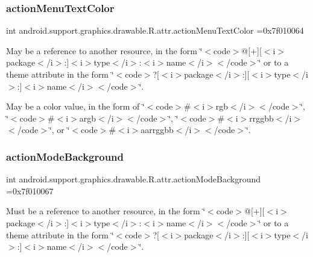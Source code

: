\subsubsection{\texorpdfstring{action\+Menu\+Text\+Color}{actionMenuTextColor}}
{\footnotesize\ttfamily int android.\+support.\+graphics.\+drawable.\+R.\+attr.\+action\+Menu\+Text\+Color =0x7f010064\hspace{0.3cm}{\ttfamily [static]}}

May be a reference to another resource, in the form \char`\"{}$<$code$>$@\mbox{[}+\mbox{]}\mbox{[}$<$i$>$package$<$/i$>$\+:\mbox{]}$<$i$>$type$<$/i$>$\+:$<$i$>$name$<$/i$>$$<$/code$>$\char`\"{} or to a theme attribute in the form \char`\"{}$<$code$>$?\mbox{[}$<$i$>$package$<$/i$>$\+:\mbox{]}\mbox{[}$<$i$>$type$<$/i$>$\+:\mbox{]}$<$i$>$name$<$/i$>$$<$/code$>$\char`\"{}. 

May be a color value, in the form of \char`\"{}$<$code$>$\#$<$i$>$rgb$<$/i$>$$<$/code$>$\char`\"{}, \char`\"{}$<$code$>$\#$<$i$>$argb$<$/i$>$$<$/code$>$\char`\"{}, \char`\"{}$<$code$>$\#$<$i$>$rrggbb$<$/i$>$$<$/code$>$\char`\"{}, or \char`\"{}$<$code$>$\#$<$i$>$aarrggbb$<$/i$>$$<$/code$>$\char`\"{}. \mbox{\label{classandroid_1_1support_1_1graphics_1_1drawable_1_1R_1_1attr_a41daf144407bb5aad9c15031a836bf73}} 
\subsubsection{\texorpdfstring{action\+Mode\+Background}{actionModeBackground}}
{\footnotesize\ttfamily int android.\+support.\+graphics.\+drawable.\+R.\+attr.\+action\+Mode\+Background =0x7f010067\hspace{0.3cm}{\ttfamily [static]}}

Must be a reference to another resource, in the form \char`\"{}$<$code$>$@\mbox{[}+\mbox{]}\mbox{[}$<$i$>$package$<$/i$>$\+:\mbox{]}$<$i$>$type$<$/i$>$\+:$<$i$>$name$<$/i$>$$<$/code$>$\char`\"{} or to a theme attribute in the form \char`\"{}$<$code$>$?\mbox{[}$<$i$>$package$<$/i$>$\+:\mbox{]}\mbox{[}$<$i$>$type$<$/i$>$\+:\mbox{]}$<$i$>$name$<$/i$>$$<$/code$>$\char`\"{}. \mbox{\label{classandroid_1_1support_1_1graphics_1_1drawable_1_1R_1_1attr_adc48cbad2205ac51ce7ad9ac31d4f313}} 
